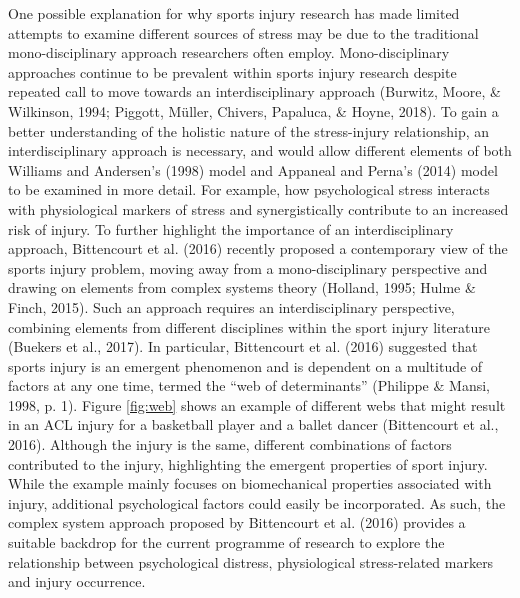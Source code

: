 \documentclass[man,floatsintext]{apa6}
\begin{document}
One possible explanation for why sports injury research has made limited attempts to examine different sources of stress may be due to the traditional mono-disciplinary approach researchers often employ.
Mono-disciplinary approaches continue to be prevalent within sports injury research despite repeated call to move towards an interdisciplinary approach (Burwitz, Moore, \& Wilkinson, 1994; Piggott, Müller, Chivers, Papaluca, \& Hoyne, 2018).
To gain a better understanding of the holistic nature of the stress-injury relationship, an interdisciplinary approach is necessary, and would allow different elements of both Williams and Andersen's (1998) model and Appaneal and Perna's (2014) model to be examined in more detail.
For example, how psychological stress interacts with physiological markers of stress and synergistically contribute to an increased risk of injury.
To further highlight the importance of an interdisciplinary approach, Bittencourt et al. (2016) recently proposed a contemporary view of the sports injury problem, moving away from a mono-disciplinary perspective and drawing on elements from complex systems theory (Holland, 1995; Hulme \& Finch, 2015).
Such an approach requires an interdisciplinary perspective, combining elements from different disciplines within the sport injury literature (Buekers et al., 2017).
In particular, Bittencourt et al. (2016) suggested that sports injury is an emergent phenomenon and is dependent on a multitude of factors at any one time, termed the \enquote{web of determinants} (Philippe \& Mansi, 1998, p. 1).
Figure \ref{fig:web} shows an example of different webs that might result in an ACL injury for a basketball player and a ballet dancer (Bittencourt et al., 2016).
Although the injury is the same, different combinations of factors contributed to the injury, highlighting the emergent properties of sport injury.
While the example mainly focuses on biomechanical properties associated with injury, additional psychological factors could easily be incorporated.
As such, the complex system approach proposed by Bittencourt et al. (2016) provides a suitable backdrop for the current programme of research to explore the relationship between psychological distress, physiological stress-related markers and injury occurrence.
\end{document}
